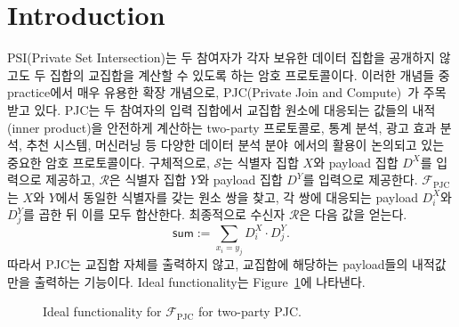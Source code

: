 \documentclass[sigconf,anonymous,review]{acmart}
\begin{document}
\maketitle
\section{Introduction}\label{sec:intro}
PSI(Private Set Intersection)는 두 참여자가 각자 보유한 데이터 집합을 공개하지 않고도 두 집합의 교집합을 계산할 수 있도록 하는 암호 프로토콜이다. %
이러한 개념들 중 practice에서 매우 유용한 확장 개념으로, PJC(Private Join and Compute)~\cite{LPR+21}가 주목받고 있다. PJC는 두 참여자의 입력 집합에서 교집합 원소에 대응되는 값들의 내적(inner product)을 안전하게 계산하는 two-party 프로토콜로, 통계 분석, 광고 효과 분석, 추천 시스템, 머신러닝 등 다양한 데이터 분석 분야~\cite{IKN+20}에서의 활용이 논의되고 있는 중요한 암호 프로토콜이다.
구체적으로, $\mathcal{S}$는 식별자 집합 $X$와 payload 집합 $D^X$를 입력으로 제공하고, $\mathcal{R}$은 식별자 집합 $Y$와 payload 집합 $D^Y$를 입력으로 제공한다. $\mathcal{F}_{\mathrm{PJC}}$는 $X$와 $Y$에서 동일한 식별자를 갖는 원소 쌍을 찾고, 각 쌍에 대응되는 payload $D^X_i$와 $D^Y_j$를 곱한 뒤 이를 모두 합산한다. 최종적으로 수신자 $\mathcal{R}$은 다음 값을 얻는다.
    \[
    \mathsf{sum}
    :=
    \sum_{x_i = y_j} D^X_i \cdot D^Y_j .
    \]
    따라서 PJC는 교집합 자체를 출력하지 않고, 교집합에 해당하는 payload들의 내적값만을 출력하는 기능이다. Ideal functionality는 Figure~\ref{fig:pjc-ideal-functionality}에 나타낸다.

    \begin{figure}[h]
    \centering
    \caption{Ideal functionality for $\mathcal{F}_{\mathrm{PJC}}$ for two-party PJC.}
    \label{fig:pjc-ideal-functionality}
    \end{figure}
\end{document}
